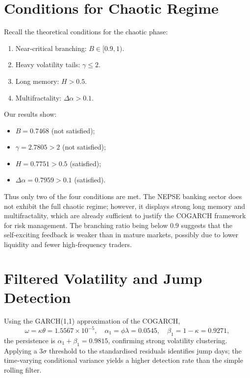 \section{Conditions for Chaotic Regime}
Recall the theoretical conditions for the chaotic phase:
\begin{enumerate}[label=(\roman*)]
    \item Near‑critical branching: $B \in [0.9,1)$.
    \item Heavy volatility tails: $\gamma \le 2$.
    \item Long memory: $H > 0.5$.
    \item Multifractality: $\Delta\alpha > 0.1$.
\end{enumerate}
Our results show:
\begin{itemize}
    \item $B = 0.7468$ (not satisfied);
    \item $\gamma = 2.7805 > 2$ (not satisfied);
    \item $H = 0.7751 > 0.5$ (satisfied);
    \item $\Delta\alpha = 0.7959 > 0.1$ (satisfied).
\end{itemize}
Thus only two of the four conditions are met. The NEPSE banking sector does not exhibit the full chaotic regime; however, it displays strong long memory and multifractality, which are already sufficient to justify the COGARCH framework for risk management. The branching ratio being below $0.9$ suggests that the self‑exciting feedback is weaker than in mature markets, possibly due to lower liquidity and fewer high‑frequency traders.

\section{Filtered Volatility and Jump Detection}
Using the GARCH(1,1) approximation of the COGARCH,
\[
\omega = \kappa\theta = 1.5567\times10^{-5},\quad
\alpha_1 = \phi\lambda = 0.0545,\quad
\beta_1 = 1-\kappa = 0.9271,
\]
the persistence is $\alpha_1+\beta_1 = 0.9815$, confirming strong volatility clustering. Applying a $3\sigma$ threshold to the standardised residuals identifies jump days; the time‑varying conditional variance yields a higher detection rate than the simple rolling filter.

